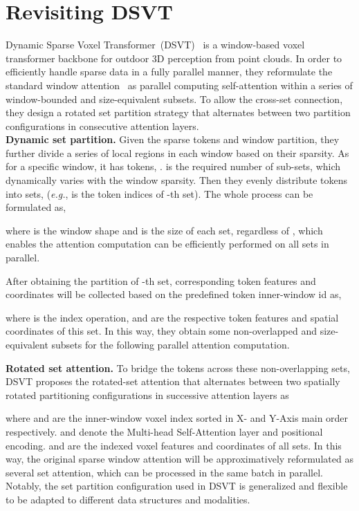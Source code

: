 \documentclass[10pt,twocolumn,letterpaper]{article}
\begin{document}
\section{Revisiting DSVT} \label{sec:revisit}
Dynamic Sparse Voxel Transformer~(DSVT)~\cite{wang2023dsvt} is a window-based voxel transformer backbone for outdoor 3D perception from point clouds. In order to efficiently handle sparse data in a fully parallel manner, they reformulate the standard window attention~\cite{liu2021swin} as parallel computing self-attention within a series of window-bounded and size-equivalent subsets. To allow the cross-set connection, they design a rotated set partition strategy that alternates between two partition configurations in consecutive attention layers. \\
\textbf{Dynamic set partition.} Given the sparse tokens and window partition, they further divide a series of local regions in each window based on their sparsity. As for a specific window, it has  tokens, .  is the required number of sub-sets, which dynamically varies with the window sparsity. Then they evenly distribute  tokens into  sets, (\textit{e.g.},  is the token indices of -th set). The whole process can be formulated as,
\vspace{-2pt}

where  is the window shape and  is the size of each set, regardless of , which enables the attention computation can be efficiently performed on all sets in parallel. 

After obtaining the partition  of -th set, corresponding token features and coordinates will be collected based on the predefined token inner-window id  as, 
\vspace{-4pt}

where  is the index operation,  and  are the respective token features and spatial coordinates   of this set. In this way, they obtain some non-overlapped and size-equivalent subsets for the following parallel attention computation.  

\noindent \textbf{Rotated set attention.} 
To bridge the tokens across these non-overlapping sets, DSVT proposes the rotated-set attention that alternates between two spatially rotated partitioning configurations in successive attention layers as
\vspace{-4pt}

where  and  are the inner-window voxel index sorted in X- and Y-Axis main order respectively.  and  denote the Multi-head Self-Attention layer and positional encoding.  and  are the indexed voxel features and coordinates of all sets. In this way, the original sparse window attention will be approximatively reformulated as several set attention, which can be processed in the same batch in parallel. Notably, the set partition configuration used in DSVT is generalized and flexible to be adapted to different data structures and modalities.
\end{document}
